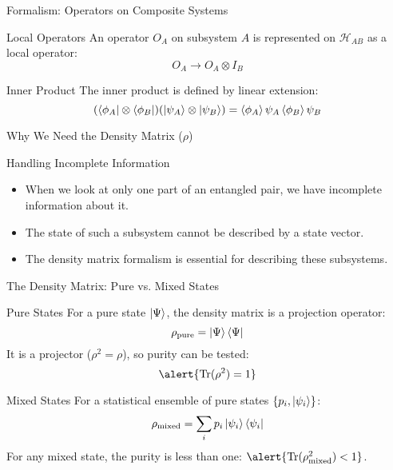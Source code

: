 \begin{frame}{Formalism: Operators on Composite Systems}
    \begin{block}{Local Operators}
      An operator $O_A$ on subsystem $A$ is represented on
      $\mathcal{H}_{AB}$ as a \alert{local operator}:
      \[
        O_A \to O_A \otimes I_B
      \]
    \end{block}
    \pause
    \begin{block}{Inner Product}
      The inner product is defined by linear extension:
      \[
        (\bra{\phi_A} \otimes \bra{\phi_B}) (\ket{\psi_A} \otimes
        \ket{\psi_B}) = \braket{\phi_A}{\psi_A} \braket{\phi_B}{\psi_B}
      \]
    \end{block}
\end{frame}

\begin{frame}{Why We Need the Density Matrix ($\rho$)}
  \begin{alertblock}{Handling Incomplete Information}
    \begin{itemize}
      \item When we look at only one part of an entangled pair, we have
        incomplete information about it.
      \pause
      \item The state of such a subsystem cannot be described by a state
        vector.
      \pause
      \item The density matrix formalism is essential for describing these
        subsystems.
    \end{itemize}
  \end{alertblock}
\end{frame}

\begin{frame}{The Density Matrix: Pure vs. Mixed States}
  \begin{block}{Pure States}
    For a pure state $\ket{\Psi}$, the density matrix is a projection operator:
    \begin{equation}
      \rho_{\text{pure}} = \ket{\Psi}\bra{\Psi}
    \end{equation}
    It is a projector ($\rho^2 = \rho$), so purity can be tested:
    \[
      \alert{\Tr(\rho^2) = 1}
    \]
  \end{block}
  \pause
  \vspace{-1em}
  \begin{block}{Mixed States}
    For a statistical ensemble of pure states $\{p_i, \ket{\psi_i}\}$:
    \begin{equation}
      \rho_{\text{mixed}} = \sum_i p_i \ket{\psi_i}\bra{\psi_i}
    \end{equation}
    For any mixed state, the purity is less than one:
    $\alert{\Tr(\rho_{\text{mixed}}^2) < 1}$.
  \end{block}
\end{frame}

